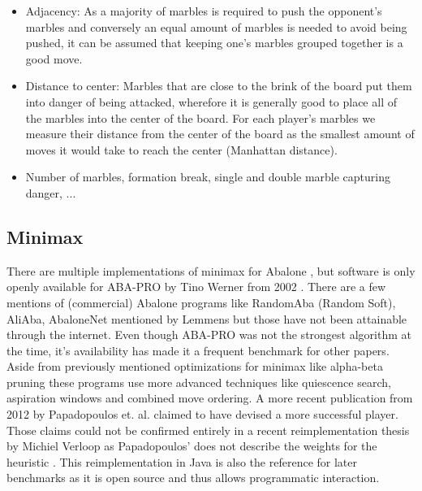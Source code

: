 \begin{itemize}
    \item Adjacency: As a majority of marbles is required to push the opponent's marbles and conversely an equal amount of marbles is needed to avoid being pushed, it can be assumed that keeping one's marbles grouped together is a good move.
    \item Distance to center: Marbles that are close to the brink of the board put them into danger of being attacked, wherefore it is generally good to place all of the marbles into the center of the board. For each player's marbles we measure their distance from the center of the board as the smallest amount of moves it would take to reach the center (Manhattan distance).
    \item Number of marbles, formation break, single and double marble capturing danger, ... \cite[p. 64]{papadopoulos_exploring_2012}
\end{itemize}

\subsection{Minimax}
There are multiple implementations of minimax for Abalone \cite{chorus_implementing_2009,lemmens_constructing_2005,ozcan_simple_2004-1,aichholzer_algorithmic_2002}, but software is only openly available for ABA-PRO by Tino Werner from 2002 \cite{aichholzer_oswin_2006}. There are a few mentions of (commercial) Abalone programs like RandomAba (Random Soft), AliAba, AbaloneNet mentioned by Lemmens \cite[p. 7]{lemmens_constructing_2005} but those have not been attainable through the internet. Even though ABA-PRO was not the strongest algorithm at the time, it's availability has made it a frequent benchmark for other papers. Aside from previously mentioned optimizations for minimax like alpha-beta pruning these programs use more advanced techniques like quiescence search, aspiration windows and combined move ordering. A more recent publication from 2012 by Papadopoulos et. al. claimed to have devised a more successful player. \cite{papadopoulos_exploring_2012}  Those claims could not be confirmed entirely in a recent reimplementation thesis by Michiel Verloop as Papadopoulos' does not describe the weights for the heuristic \cite{verloop_critical_nodate}. This reimplementation in Java \cite{verloop_abaloneai_nodate} is also the reference for later benchmarks as it is open source \cite{verloop_abaloneai_nodate} and thus allows programmatic interaction.

